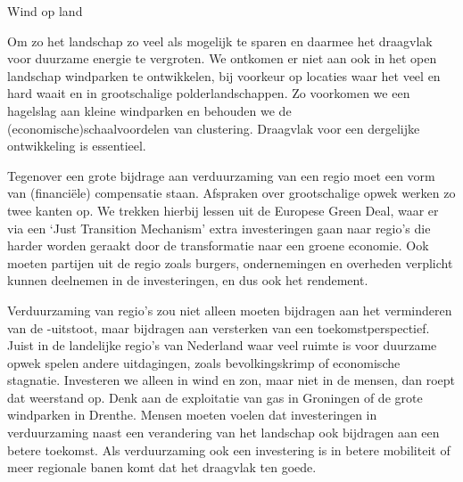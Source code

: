 \begin{voorstel}{Wind op land}
\begin{multicols}{2}
\begin{aanbevelingen}
Om zo het landschap zo veel als mogelijk te sparen en daarmee het draagvlak voor duurzame energie te vergroten. We ontkomen er niet aan ook in het open landschap windparken te ontwikkelen, bij voorkeur op locaties waar het veel en hard waait en in grootschalige polderlandschappen. Zo voorkomen we een hagelslag aan kleine windparken en behouden we de (economische)schaalvoordelen van clustering. Draagvlak voor een dergelijke ontwikkeling is essentieel.

Tegenover een grote bijdrage aan verduurzaming van een regio moet een vorm van (financiële) compensatie staan. Afspraken over grootschalige opwek werken zo twee kanten op. We trekken hierbij lessen uit de Europese Green Deal, waar er via een ‘Just Transition Mechanism’ extra investeringen gaan naar regio’s die harder worden geraakt door de transformatie naar een groene economie. Ook moeten partijen uit de regio zoals burgers, ondernemingen en overheden verplicht kunnen deelnemen in de investeringen, en dus ook het rendement.

Verduurzaming van regio’s zou niet alleen moeten bijdragen aan het verminderen van de \COO-uitstoot, maar bijdragen aan versterken van een toekomstperspectief. Juist in de landelijke regio’s van Nederland waar veel ruimte is voor duurzame opwek spelen andere uitdagingen, zoals bevolkingskrimp of economische stagnatie. Investeren we alleen in wind en zon, maar niet in de mensen, dan roept dat weerstand op. Denk aan de exploitatie van gas in Groningen of de grote windparken in Drenthe. Mensen moeten voelen dat investeringen in verduurzaming naast een verandering van het landschap ook bijdragen aan een betere toekomst. Als verduurzaming ook een investering is in betere mobiliteit of meer regionale banen komt dat het draagvlak ten goede.

\end{aanbevelingen}

\end{multicols}


\end{voorstel}
